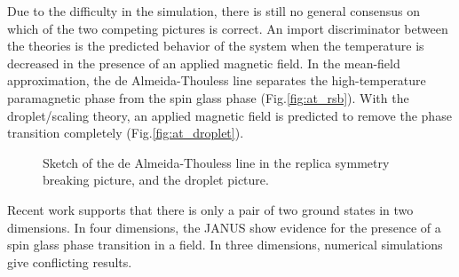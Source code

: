 
Due to the difficulty in the simulation, there is still no general consensus on
which of the two competing pictures is correct. 
An import discriminator between the theories is the predicted behavior of 
the system when the temperature is decreased in the presence of an applied magnetic
field. 
In the mean-field approximation, the de Almeida-Thouless line separates the 
high-temperature paramagnetic phase from the spin glass phase (Fig.\ref{fig:at_rsb}). 
With the droplet/scaling theory, an applied magnetic field is predicted to remove
the phase transition completely (Fig.\ref{fig:at_droplet}).

\begin{figure}
  \centering
  \hspace{0.5cm}
  \caption{Sketch of the de Almeida-Thouless line in the replica symmetry breaking 
picture, and the droplet picture.}
  \label{fig:at_line}
\end{figure}

Recent work supports that there is only a pair of two ground states in two dimensions.
In four dimensions, the JANUS show evidence for the presence of a spin glass
phase transition in a field. In three dimensions, numerical simulations give 
conflicting results.


